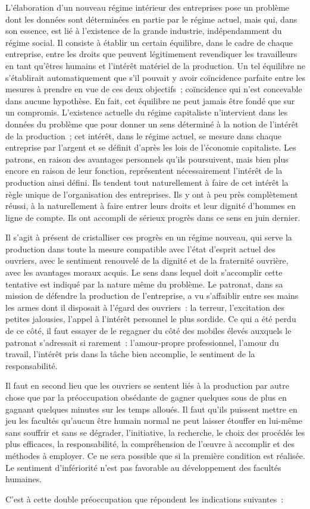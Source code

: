 \documentclass[french,twoside]{book} %
\begin{document}
L'élaboration d'un nouveau régime intérieur des entreprises pose un problème dont les données sont déterminées en partie par le régime actuel, mais qui, dans son essence, est lié à l'existence de la grande industrie, indépendamment du régime social. Il consiste à établir un certain équilibre, dans le cadre de chaque entreprise, entre les droits que peuvent légitimement revendiquer les travailleurs en tant qu'êtres humains et l'intérêt matériel de la production. Un tel équilibre ne s'établirait automatiquement que s'il pouvait y avoir coïncidence parfaite entre les mesures à prendre en vue de ces deux objectifs ; coïncidence qui n’est concevable dans aucune hypothèse. En fait, cet équilibre ne peut jamais être fondé que sur un compromis. L'existence actuelle du régime capitaliste n'intervient dans les données du problème que pour donner un sens déterminé à la notion de l'intérêt de la production ; cet intérêt, dans le régime actuel, se mesure dans chaque entreprise par l'argent et se définit d'après les lois de l'économie capitaliste. Les patrons, en raison des avantages personnels qu'ils poursuivent, mais bien plus encore en raison de leur fonction, représentent nécessairement l'intérêt de la production ainsi défini. Ils tendent tout naturellement à faire de cet intérêt la règle unique de l'organisation des entreprises. Ils y ont à peu près complètement réussi, à la naturellement à faire entrer leurs droits et leur dignité d'hommes en ligne de compte. Ils ont accompli de sérieux progrès dans ce sens en juin dernier.\par
Il s'agit à présent de cristalliser ces progrès en un régime nouveau, qui serve la production dans toute la mesure compatible avec l'état d'esprit actuel des ouvriers, avec le sentiment renouvelé de la dignité et de la fraternité ouvrière, avec les avantages moraux acquis. Le sens dans lequel doit s'accomplir cette tentative est indiqué par la nature même du problème. Le patronat, dans sa mission de défendre la production de l'entreprise, a vu s'affaiblir entre ses mains les armes dont il disposait à l'égard des ouvriers : la terreur, l'excitation des petites jalousies, l'appel à l'intérêt personnel le plus sordide. Ce qui a été perdu de ce côté, il faut essayer de le regagner du côté des mobiles élevés auxquels le patronat s'adressait si rarement : l'amour-propre professionnel, l'amour du travail, l'intérêt pris dans la tâche bien accomplie, le sentiment de la responsabilité.\par
\par
Il faut en second lieu que les ouvriers se sentent liés à la production par autre chose que par la préoccupation obsédante de gagner quelques sous de plus en gagnant quelques minutes sur les temps alloués. Il faut qu'ils puissent mettre en jeu les facultés qu'aucun être humain normal ne peut laisser étouffer en lui-même sans souffrir et sans se dégrader, l'initiative, la recherche, le choix des procédés les plus efficaces, la responsabilité, la compréhension de l'œuvre à accomplir et des méthodes à employer. Ce ne sera possible que si la première condition est réalisée. Le sentiment d'infériorité n'est pas favorable au développement des facultés humaines.\par
C'est à cette double préoccupation que répondent les indications suivantes :\par
\end{document}
